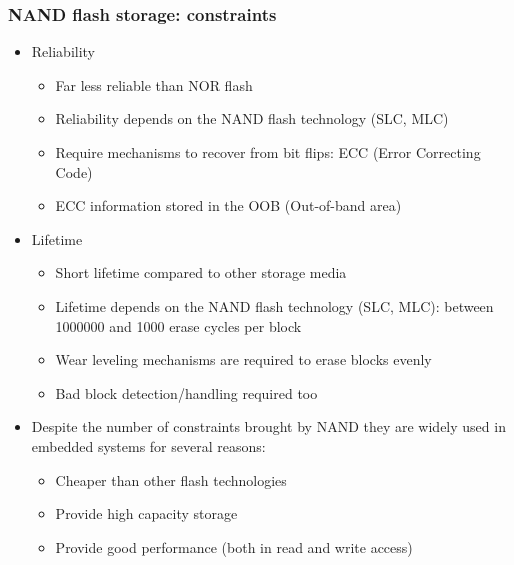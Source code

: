 \begin{frame}
  \frametitle{NAND flash storage: constraints}
  \begin{itemize}
  \item Reliability
    \begin{itemize}
    \item Far less reliable than NOR flash
    \item Reliability depends on the NAND flash technology (SLC, MLC)
    \item Require mechanisms to recover from bit flips: ECC (Error Correcting Code)
    \item ECC information stored in the OOB (Out-of-band area)
    \end{itemize}
  \item Lifetime
    \begin{itemize}
    \item Short lifetime compared to other storage media
    \item Lifetime depends on the NAND flash technology (SLC, MLC):
      between 1000000 and 1000 erase cycles per block
    \item Wear leveling mechanisms are required to erase blocks evenly
    \item Bad block detection/handling required too
    \end{itemize}
  \item Despite the number of constraints brought by NAND they are
  widely used in embedded systems for several reasons:
    \begin{itemize}
    \item Cheaper than other flash technologies
    \item Provide high capacity storage
    \item Provide good performance (both in read and write access)
    \end{itemize}
  \end{itemize}
\end{frame}

